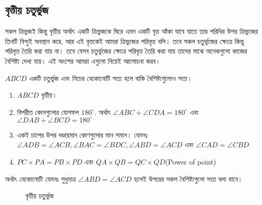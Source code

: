 \documentclass[a4paper,11pt]{article}
\newcommand{\drg}{^{\circ}}
\begin{document}
\subsection{বৃত্তীয় চতুর্ভুজ}
সকল ত্রিভুজই কিন্তু বৃত্তীয় অর্থাৎ একটি ত্রিভুজকে ঘিরে এমন একটি বৃত্ত আঁকা যাবে যাতে তার পরিধির উপর ত্রিভুজের তিনটি বিন্দুই অবস্থান করে, আর এই বৃত্তকেই আমরা ত্রিভুজের পরিবৃত্ত বলি। তবে সকল চতুর্ভুজের ক্ষেত্রে কিন্তু পরিবৃত্ত তৈরি করা যায় না। তবে যেসব চতুর্ভুজের ক্ষেত্রে পরিবৃত্ত তৈরি করা যায় তাদের মাঝে অনেকগুলো কাজের বৈশিষ্ট্য দেখা যায়। এই অংশের আমরা এগুলো নিয়েই আলোচনা করব। 
\begin{thrm}
	\label{cyclicth}
	$ABCD$ একটি চতুর্ভুজ এবং নিচের যেকোনোটি সত্য হলে বাকি বৈশিষ্ট্যগুলোও সত্য।  
	\begin{enumerate}[label=(\alph*), nosep]
		\item $ABCD$ বৃত্তীয়।
		\item বিপরীত কোনগুলোর যোগফল $180\drg$. অর্থাৎ $\angle ABC+ \angle CDA=180\drg$ এবং $\angle DAB+ \angle BCD=180\drg$
		\item একই চাপের উপর দণ্ডায়মান কোণগুলোর মান সমান। যেমনঃ $\angle ADB=\angle ACB, \angle BAC=\angle BDC, \angle ABD=\angle ACD$ এবং $\angle CAD=\angle CBD$
		\item $PC\times PA=PB\times PD$ এবং $QA\times QB=QC\times QD$(Power of point)
	\end{enumerate}
	অর্থাৎ যেকোনোটি যেমনঃ শুধুমাত্র $\angle ABD=\angle ACD$ হলেই উপরের সকল বৈশিষ্ট্যগুলো সত্য বলা যাবে। 
	\begin{figure}[h]
		\centering
		\label{cyclic}
		\caption{বৃত্তীয় চতুর্ভুজ}
	\end{figure}
\end{thrm}
\end{document}

